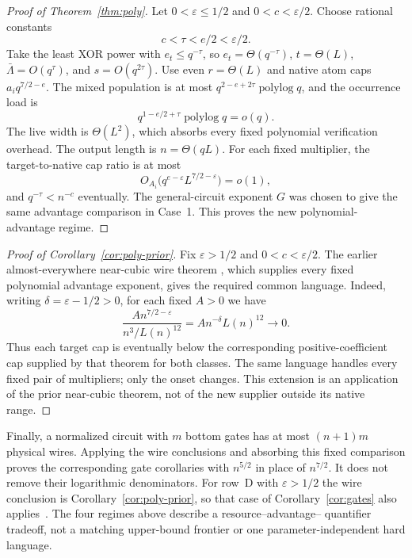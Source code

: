 \documentclass[11pt,letterpaper]{article}
\theoremstyle{definition}
\theoremstyle{remark}
\begin{document}
\begin{proof}[Proof of Theorem~\ref{thm:poly}]
Let $0<\varepsilon\le1/2$ and $0<c<\varepsilon/2$.
Choose rational constants
\[
 c<\tau<e/2<\varepsilon/2.
\]
Take the least XOR power with $e_t\le q^{-\tau}$, so
$e_t=\Theta(q^{-\tau})$, $t=\Theta(L)$,
$\bar\Lambda=O(q^\tau)$, and $s=O(q^{2\tau})$.
Use even $r=\Theta(L)$ and native atom caps $a_iq^{7/2-e}$.
The mixed population is at most
$q^{2-e+2\tau}\operatorname{polylog}q$, and the occurrence load is
\[
 q^{1-e/2+\tau}\operatorname{polylog}q=o(q).
\]
The live width is $\Theta(L^2)$, which absorbs every fixed
polynomial verification overhead. The output length is
$n=\Theta(qL)$. For each fixed multiplier, the target-to-native
cap ratio is at most
\[
 O_{A_i}\bigl(q^{e-\varepsilon}L^{7/2-\varepsilon}\bigr)=o(1),
\]
and $q^{-\tau}<n^{-c}$ eventually. The general-circuit exponent $G$
was chosen to give the same advantage comparison in Case~1.
This proves the new polynomial-advantage regime.
\end{proof}

\begin{proof}[Proof of Corollary~\ref{cor:poly-prior}]
Fix $\varepsilon>1/2$ and $0<c<\varepsilon/2$. The earlier
almost-everywhere near-cubic wire theorem
\cite[Theorem~2.3]{NagCubic}, which supplies every fixed polynomial
advantage exponent, gives the required common language. Indeed,
writing $\delta=\varepsilon-1/2>0$, for each fixed $A>0$ we have
\[
 \frac{A n^{7/2-\varepsilon}}{n^3/L(n)^{12}}
 =A n^{-\delta}L(n)^{12}\longrightarrow0.
\]
Thus each target cap is eventually below the corresponding
positive-coefficient cap supplied by that theorem for both classes.
The same language handles every fixed pair of multipliers; only the
onset changes. This extension is an application of the prior
near-cubic theorem, not of the new supplier outside its native range.
\end{proof}

Finally, a normalized circuit with $m$ bottom gates has at most
$(n+1)m$ physical wires. Applying the wire conclusions and absorbing
this fixed comparison proves the corresponding gate corollaries with
$n^{5/2}$ in place of $n^{7/2}$. It does not remove their logarithmic
denominators. For row~D with $\varepsilon>1/2$ the wire conclusion is
Corollary~\ref{cor:poly-prior}, so that case of Corollary~\ref{cor:gates}
also applies~\cite[Theorem~2.3]{NagCubic}. The four regimes above describe a resource--advantage--
quantifier tradeoff, not a matching upper-bound frontier or one
parameter-independent hard language.
\end{document}
